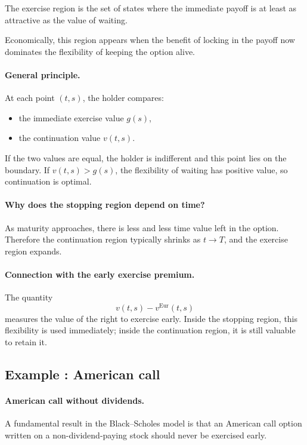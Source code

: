 \documentclass[11pt]{article}
\theoremstyle{definition}
\theoremstyle{plain}
\begin{document}
The exercise region is the set of states where the immediate payoff is
at least as attractive as the value of waiting.

Economically, this region appears when the benefit of locking in the
payoff now dominates the flexibility of keeping the option alive.

\paragraph{General principle.}
At each point \((t,s)\), the holder compares:
\begin{itemize}[leftmargin=1.4em]
    \item the immediate exercise value \(g(s)\),
    \item the continuation value \(v(t,s)\).
\end{itemize}

If the two values are equal, the holder is indifferent and this point
lies on the boundary.
If \(v(t,s)>g(s)\), the flexibility of waiting has positive value, so
continuation is optimal.

\paragraph{Why does the stopping region depend on time?}
As maturity approaches, there is less and less time value left in the
option.
Therefore the continuation region typically shrinks as \(t\to T\),
and the exercise region expands.

\paragraph{Connection with the early exercise premium.}
The quantity
\[
v(t,s)-v^{\mathrm{Eur}}(t,s)
\]
measures the value of the right to exercise early.
Inside the stopping region, this flexibility is used immediately;
inside the continuation region, it is still valuable to retain it.

\subsection{Example : American call}

\paragraph{American call without dividends.}

A fundamental result in the Black--Scholes model is that an American call option written on a non-dividend-paying stock should never be exercised early.
\end{document}
